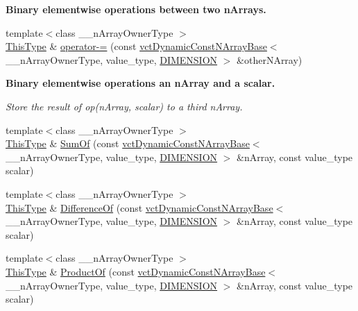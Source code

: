 \begin{Indent}{\bf Binary elementwise operations between two n\+Arrays.}
\begin{DoxyCompactItemize}
\item 
{\footnotesize template$<$class \+\_\+\+\_\+n\+Array\+Owner\+Type $>$ }\\\hyperlink{classvct_dynamic_const_n_array_base_a5123caffcf1455a1b99003877eade897}{This\+Type} \& \hyperlink{classvct_dynamic_n_array_base_afb586cea0da01b8999f422648824e4c4}{operator-\/=} (const \hyperlink{classvct_dynamic_const_n_array_base}{vct\+Dynamic\+Const\+N\+Array\+Base}$<$ \+\_\+\+\_\+n\+Array\+Owner\+Type, value\+\_\+type, \hyperlink{classvct_dynamic_n_array_base_aa66532d28588bdf26d08fb593db815d6abfcde386ec801b212d7c42d63a4f3837}{D\+I\+M\+E\+N\+S\+I\+O\+N} $>$ \&other\+N\+Array)
\end{DoxyCompactItemize}
\end{Indent}
\begin{Indent}{\bf Binary elementwise operations an n\+Array and a scalar.}\par
{\em Store the result of op(n\+Array, scalar) to a third n\+Array. }\begin{DoxyCompactItemize}
\item 
{\footnotesize template$<$class \+\_\+\+\_\+n\+Array\+Owner\+Type $>$ }\\\hyperlink{classvct_dynamic_const_n_array_base_a5123caffcf1455a1b99003877eade897}{This\+Type} \& \hyperlink{classvct_dynamic_n_array_base_a2b998802cf0bc185b82088888bee2d36}{Sum\+Of} (const \hyperlink{classvct_dynamic_const_n_array_base}{vct\+Dynamic\+Const\+N\+Array\+Base}$<$ \+\_\+\+\_\+n\+Array\+Owner\+Type, value\+\_\+type, \hyperlink{classvct_dynamic_n_array_base_aa66532d28588bdf26d08fb593db815d6abfcde386ec801b212d7c42d63a4f3837}{D\+I\+M\+E\+N\+S\+I\+O\+N} $>$ \&n\+Array, const value\+\_\+type scalar)
\item 
{\footnotesize template$<$class \+\_\+\+\_\+n\+Array\+Owner\+Type $>$ }\\\hyperlink{classvct_dynamic_const_n_array_base_a5123caffcf1455a1b99003877eade897}{This\+Type} \& \hyperlink{classvct_dynamic_n_array_base_aa8f56ece9c918df40c632462e21c37c3}{Difference\+Of} (const \hyperlink{classvct_dynamic_const_n_array_base}{vct\+Dynamic\+Const\+N\+Array\+Base}$<$ \+\_\+\+\_\+n\+Array\+Owner\+Type, value\+\_\+type, \hyperlink{classvct_dynamic_n_array_base_aa66532d28588bdf26d08fb593db815d6abfcde386ec801b212d7c42d63a4f3837}{D\+I\+M\+E\+N\+S\+I\+O\+N} $>$ \&n\+Array, const value\+\_\+type scalar)
\item 
{\footnotesize template$<$class \+\_\+\+\_\+n\+Array\+Owner\+Type $>$ }\\\hyperlink{classvct_dynamic_const_n_array_base_a5123caffcf1455a1b99003877eade897}{This\+Type} \& \hyperlink{classvct_dynamic_n_array_base_a9ef2a1e5592e6c746e12a9f923cc9d45}{Product\+Of} (const \hyperlink{classvct_dynamic_const_n_array_base}{vct\+Dynamic\+Const\+N\+Array\+Base}$<$ \+\_\+\+\_\+n\+Array\+Owner\+Type, value\+\_\+type, \hyperlink{classvct_dynamic_n_array_base_aa66532d28588bdf26d08fb593db815d6abfcde386ec801b212d7c42d63a4f3837}{D\+I\+M\+E\+N\+S\+I\+O\+N} $>$ \&n\+Array, const value\+\_\+type scalar)

\end{DoxyCompactItemize}
\end{Indent}
